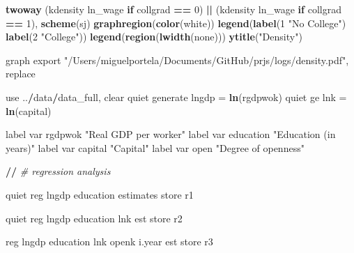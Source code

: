\documentclass[
  12pt,
]{article}
\newenvironment{Shaded}{\begin{snugshade}}{\end{snugshade}}
\newcommand{\CommentTok}[1]{\textcolor[rgb]{0.56,0.35,0.01}{\textit{#1}}}
\newcommand{\ControlFlowTok}[1]{\textcolor[rgb]{0.13,0.29,0.53}{\textbf{#1}}}
\newcommand{\DecValTok}[1]{\textcolor[rgb]{0.00,0.00,0.81}{#1}}
\newcommand{\ErrorTok}[1]{\textcolor[rgb]{0.64,0.00,0.00}{\textbf{#1}}}
\newcommand{\KeywordTok}[1]{\textcolor[rgb]{0.13,0.29,0.53}{\textbf{#1}}}
\newcommand{\NormalTok}[1]{#1}
\newcommand{\OperatorTok}[1]{\textcolor[rgb]{0.81,0.36,0.00}{\textbf{#1}}}
\newcommand{\StringTok}[1]{\textcolor[rgb]{0.31,0.60,0.02}{#1}}
\begin{document}
\begin{Shaded}
\begin{Highlighting}[]
{\KeywordTok{twoway}\NormalTok{ (kdensity ln_wage }\ControlFlowTok{if}\NormalTok{ collgrad }\OperatorTok{==}\StringTok{ }\DecValTok{0}\NormalTok{) }\OperatorTok{||}\StringTok{ }\NormalTok{(kdensity ln_wage }\ControlFlowTok{if}\NormalTok{ collgrad }\OperatorTok{==}\StringTok{ }\DecValTok{1}\NormalTok{), }\KeywordTok{scheme}\NormalTok{(sj) }\KeywordTok{graphregion}\NormalTok{(}\KeywordTok{color}\NormalTok{(white)) }\KeywordTok{legend}\NormalTok{(}\KeywordTok{label}\NormalTok{(}\DecValTok{1} \StringTok{"No College"}\NormalTok{) }\KeywordTok{label}\NormalTok{(}\DecValTok{2} \StringTok{"College"}\NormalTok{)) }\KeywordTok{legend}\NormalTok{(}\KeywordTok{region}\NormalTok{(}\KeywordTok{lwidth}\NormalTok{(none))) }\KeywordTok{ytitle}\NormalTok{(}\StringTok{"Density"}\NormalTok{)}

\NormalTok{graph export }\StringTok{"/Users/miguelportela/Documents/GitHub/prjs/logs/density.pdf"}\NormalTok{, replace}

\NormalTok{use ..}\OperatorTok{/}\NormalTok{data}\OperatorTok{/}\NormalTok{data_full, clear}
\NormalTok{        quiet generate lngdp =}\StringTok{ }\KeywordTok{ln}\NormalTok{(rgdpwok)}
\NormalTok{        quiet ge lnk =}\StringTok{ }\KeywordTok{ln}\NormalTok{(capital)}

\NormalTok{        label var rgdpwok }\StringTok{"Real GDP per worker"}
\NormalTok{        label var education }\StringTok{"Education (in years)"}
\NormalTok{        label var capital }\StringTok{"Capital"}
\NormalTok{        label var open }\StringTok{"Degree of openness"}

\OperatorTok{/}\ErrorTok{/}\StringTok{ }\CommentTok{# regression analysis}

\StringTok{    }\NormalTok{quiet reg lngdp education}
\NormalTok{        estimates store r1}

\NormalTok{    quiet reg lngdp education lnk}
\NormalTok{        est store r2}

\NormalTok{    reg lngdp education lnk openk i.year}
\NormalTok{        est store r3}

}
\end{Highlighting}
\end{Shaded}
\end{document}
